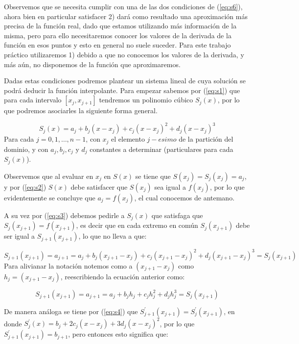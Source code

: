 Observemos que se necesita cumplir con una de las dos condiciones de (\ref{eq:s6}), ahora bien en particular satisfacer 2) dará como resultado una aproximación más precisa de la función real, dado que estamos utilizando más información de la misma, pero para ello necesitaremos conocer los valores de la derivada de la función en esos puntos y esto en general no suele suceder. Para este trabajo práctico utilizaremos 1) debido a que no conocemos los valores de la derivada, y más aún, no disponemos de la función que aproximaremos.

Dadas estas condiciones podremos plantear un sistema lineal de cuya solución se podrá deducir la función interpolante. Para empezar sabemos por (\ref{eq:s1}) que para cada intervalo $[x_j, x_{j+1}]$ tendremos un polinomio cúbico $S_j(x)$, por lo que podremos asociarles la siguiente forma general. 

\begin{equation}
	S_j(x) = a_j + b_j(x - x_j) + c_j(x - x_j)^2 + d_j(x - x_j)^3
\end{equation}
Para cada $j = 0, 1, \dots, n-1$, con $x_j$ el elemento $j-esimo$ de la partición del dominio, y con $a_j, b_j, c_j$ y $d_j$ constantes a determinar (particulares para cada $S_j(x)$).

Observemos que al evaluar en $x_j$ en $S(x)$ se tiene que $S(x_j) = S_j(x_j) = a_j$, y por (\ref{eq:s2}) $S(x)$ debe satisfacer que $S(x_j)$ sea igual a $f(x_j)$, por lo que evidentemente se concluye que $a_j = f(x_j)$, el cual conocemos de antemano.

A su vez por (\ref{eq:s3}) debemos pedirle a $S_j(x)$ que satisfaga que $S_j(x_{j+1}) = f(x_{j+1})$, es decir que en cada extremo en común $S_j(x_{j+1})$ debe ser igual a $S_{j+1}(x_{j+1})$, lo que no lleva a que:

\begin{equation}
	S_{j+1}(x_{j+1}) = a_{j+1} =  a_{j} + b_j(x_{j+1} - x_j) + c_{j}(x_{j+1} - x_j)^2 + d_{j}(x_{j+1} - x_j)^3 = S_j(x_{j+1})
\end{equation} 
 Para alivianar la notación notemos como a $(x_{j+1} - x_j)$ como $h_j = (x_{j+1} - x_j)$, reescribiendo la ecuación anterior como:

\begin{equation}
	S_{j+1}(x_{j+1}) = a_{j+1} =  a_{j} + b_jh_j + c_{j}h_j^2 + d_{j}h_j^3 = S_j(x_{j+1})
\end{equation} 

De manera análoga se tiene por (\ref{eq:s4}) que $S_{j+1}^{'}(x_{j+1}) = S_j^{'}(x_{j+1})$, en donde $S_j^{'}(x) =  b_j + 2c_{j}(x - x_j) + 3d_{j}(x - x_j)^2$, por lo que $S_{j+1}^{'}(x_{j+1}) =  b_{j+1}$, pero entonces esto significa que:
 
